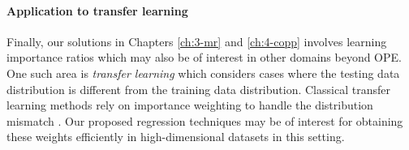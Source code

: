 \paragraph*{Application to transfer learning}
Finally, our solutions in Chapters \ref*{ch:3-mr} and \ref*{ch:4-copp} involves learning importance ratios which may also be of interest in other domains beyond OPE. 
One such area is \emph{transfer learning} which considers cases where the testing data distribution is different from the training data distribution. 
Classical transfer learning methods rely on importance weighting to handle the distribution mismatch \citep{SHIMODAIRA2000Improving, sugiyama2007covariate, huang2007correcting, sugiyama2008direct,lu2021rethinking}. 
Our proposed regression techniques may be of interest for obtaining these weights efficiently in high-dimensional datasets in this setting.  

%
